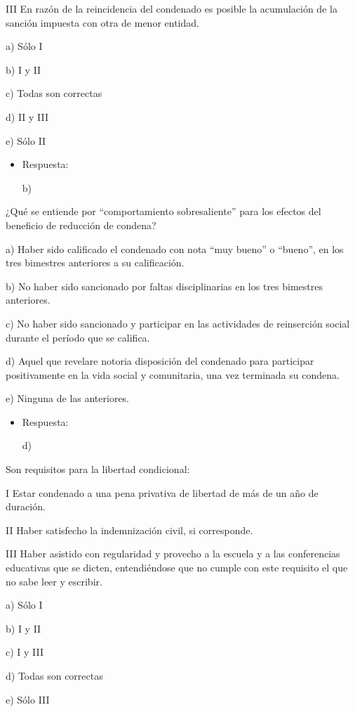 \documentclass[letterpaper, 11pt]{article}
\begin{document}
III En razón de la reincidencia del condenado es posible la
acumulación de la sanción impuesta con otra de menor entidad.


a) Sólo I

b) I y II

c) Todas son correctas

d) II y III

e) Sólo II

\begin{itemize}
\item Respuesta:

b)
\end{itemize}


¿Qué se entiende por “comportamiento sobresaliente” para los efectos
del beneficio de reducción de condena?

a) Haber sido calificado el condenado con nota “muy bueno” o “bueno”,
en los tres bimestres anteriores a su calificación.

b) No haber sido sancionado por faltas disciplinarias en los tres
bimestres anteriores.

c) No haber sido sancionado y participar en las actividades de
reinserción social durante el período que se califica.

d) Aquel que revelare notoria disposición del condenado para
participar positivamente en la vida social y comunitaria, una vez
terminada su condena.

e) Ninguna de las anteriores.


\begin{itemize}
\item Respuesta:

d)
\end{itemize}


Son requisitos para la libertad condicional:

I Estar condenado a una pena privativa de libertad de más de un año de
duración.

II Haber satisfecho la indemnización civil, si corresponde.

III Haber asistido con regularidad y provecho a la escuela y a las
conferencias educativas que se dicten, entendiéndose que no cumple con
este requisito el que no sabe leer y escribir.

a) Sólo I

b) I y II

c) I y III

d) Todas son correctas

e) Sólo III
\end{document}
